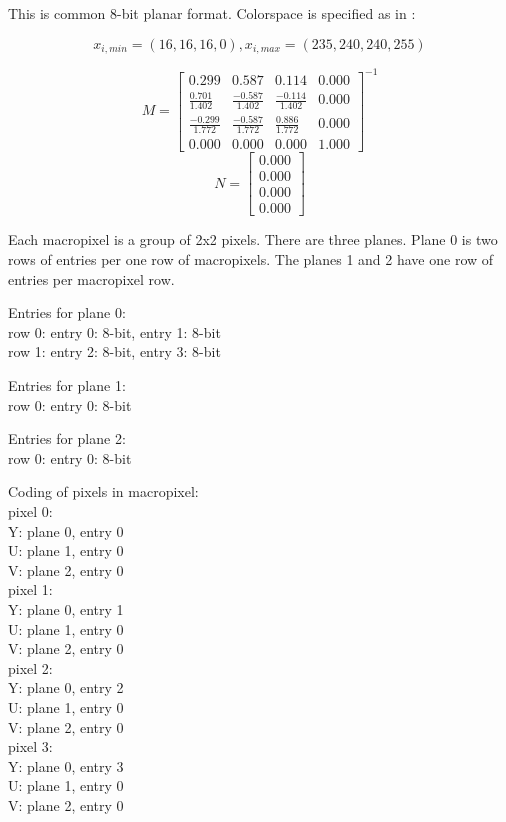This is common 8-bit planar format. Colorspace is specified as in \cite{BT.601}:

\begin{displaymath}
x_{i,min} = (16, 16, 16, 0),
x_{i,max} = (235, 240, 240, 255)
\end{displaymath}

\begin{displaymath}
M =
  \left[ \begin{array}{ rrrr }
    0.299                   & 0.587                 & 0.114                 & 0.000 \\
    \frac{0.701}{1.402}     & \frac{-0.587}{1.402}  & \frac{-0.114}{1.402}  & 0.000 \\
    \frac{-0.299}{1.772}    & \frac{-0.587}{1.772}  & \frac{0.886}{1.772}   & 0.000 \\
    0.000                   & 0.000                 & 0.000                 & 1.000
  \end{array} \right]^{-1}
\end{displaymath}
\begin{displaymath}
N =
  \left[ \begin{array}{ r }
    0.000 \\
    0.000 \\
    0.000 \\
    0.000
  \end{array} \right]
\end{displaymath}

Each macropixel is a group of 2x2 pixels. There are three planes. Plane 0 is two rows of entries per one row of macropixels. The planes 1 and 2 have one row of entries per macropixel row.

Entries for plane 0: \\
row 0: entry 0: 8-bit, entry 1: 8-bit \\
row 1: entry 2: 8-bit, entry 3: 8-bit

Entries for plane 1: \\
row 0: entry 0: 8-bit

Entries for plane 2: \\
row 0: entry 0: 8-bit

Coding of pixels in macropixel: \\
pixel 0: \\
Y: plane 0, entry 0 \\
U: plane 1, entry 0 \\
V: plane 2, entry 0 \\
pixel 1: \\
Y: plane 0, entry 1 \\
U: plane 1, entry 0 \\
V: plane 2, entry 0 \\
pixel 2: \\
Y: plane 0, entry 2 \\
U: plane 1, entry 0 \\
V: plane 2, entry 0 \\
pixel 3: \\
Y: plane 0, entry 3 \\
U: plane 1, entry 0 \\
V: plane 2, entry 0 \\

